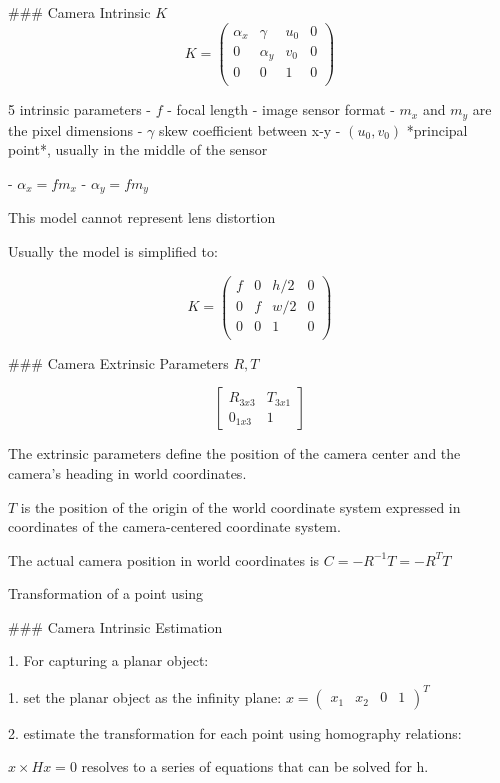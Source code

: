 ### Camera Intrinsic $K$
$$ K = \left( \begin{matrix} 
\alpha_x & \gamma & u_0 & 0 \\
0 & \alpha_y  & v_0 & 0 \\
0 & 0 &  1 & 0 \\
\end{matrix}
\right) $$

5 intrinsic parameters
- $f$ - focal length
- image sensor format - $m_x$ and $m_y$ are the pixel dimensions
- $\gamma$ skew coefficient between x-y
- $(u_0,v_0)$ *principal point*, usually in the middle of the sensor

- $\alpha_x = f m_x $
- $\alpha_y = f m_y $

This model cannot represent lens distortion

Usually the model is simplified to:

$$ K = \left( \begin{matrix} 
f & 0 & h/2 & 0 \\
0 & f  & w/2 & 0 \\
0 & 0 &  1 & 0 \\
\end{matrix}
\right) $$

### Camera Extrinsic Parameters $R,T$

$$ \left[ \begin{matrix} 
R_{3x3} & T_{3x1} \\
0_{1x3} & 1 \end{matrix}
\right] $$

The extrinsic parameters define the position of the camera center and the camera's heading in world coordinates. 

$T$ is the position of the origin of the world coordinate system expressed in coordinates of the camera-centered coordinate system. 

The actual camera position in world coordinates is $C = -R^{-1}T=-R^{T}T $

Transformation of a point using 

### Camera Intrinsic Estimation

1. For capturing a planar object:

   1. set the planar object as the infinity plane: $x = ( \begin{matrix} x_1 & x_2 & 0 & 1 \end{matrix})^T$

   2. estimate the transformation for each point using homography relations:

      $ x \times H x = 0$ resolves to a series of equations that can be solved for h.

